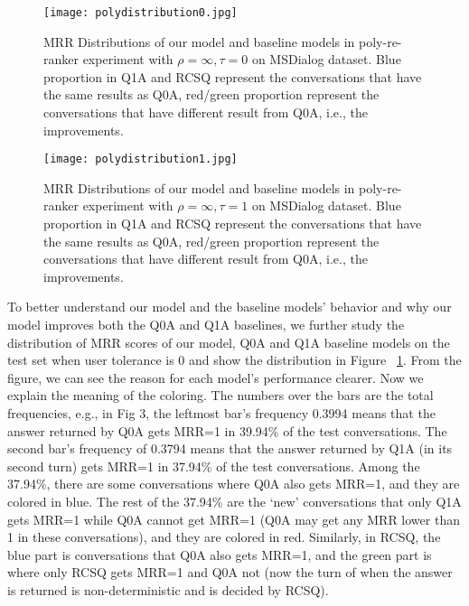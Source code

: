 \documentclass[format=acmsmall, review=False, screen=true]{acmart}
\begin{document}
\begin{figure}[t]
  \centering
  \texttt{[image: polydistribution0.jpg]}
  \caption{MRR Distributions of our model and baseline models in poly-re-ranker experiment with $\rho=\infty, \tau=0$ on MSDialog dataset. Blue proportion in Q1A and RCSQ represent the conversations that have the same results as Q0A, red/green proportion represent the conversations that have different result from Q0A, i.e., the improvements.}
  \label{polydistribution0}
\end{figure}


\begin{figure}[t]
  \centering
  \texttt{[image: polydistribution1.jpg]}
  \caption{MRR Distributions of our model and baseline models in poly-re-ranker experiment with $\rho=\infty, \tau=1$ on MSDialog dataset. Blue proportion in Q1A and RCSQ represent the conversations that have the same results as Q0A, red/green proportion represent the conversations that have different result from Q0A, i.e., the improvements.}
  \label{polydistribution1}
\end{figure}

To better understand our model and the baseline models' behavior and why our model improves both the Q0A and Q1A baselines, we further study the distribution of MRR scores of our model, Q0A and Q1A baseline models on the test set when user tolerance is 0 and show the distribution in Figure ~\ref{polydistribution0}. From the figure, we can see the reason for each model's performance clearer. Now we explain the meaning of the coloring. The numbers over the bars are the total frequencies, e.g., in Fig 3, the leftmost bar's frequency 0.3994 means that the answer returned by Q0A gets MRR=1 in 39.94\% of the test conversations. The second bar's frequency of 0.3794 means that the answer returned by Q1A (in its second turn) gets MRR=1 in 37.94\% of the test conversations. Among the 37.94\%, there are some conversations where Q0A also gets MRR=1, and they are colored in blue. The rest of the 37.94\% are the `new' conversations that only Q1A gets MRR=1 while Q0A cannot get MRR=1 (Q0A may get any MRR lower than 1 in these conversations), and they are colored in red. Similarly, in RCSQ, the blue part is conversations that Q0A also gets MRR=1, and the green part is where only RCSQ gets MRR=1 and Q0A not (now the turn of when the answer is returned is non-deterministic and is decided by RCSQ).
    
\end{document}
